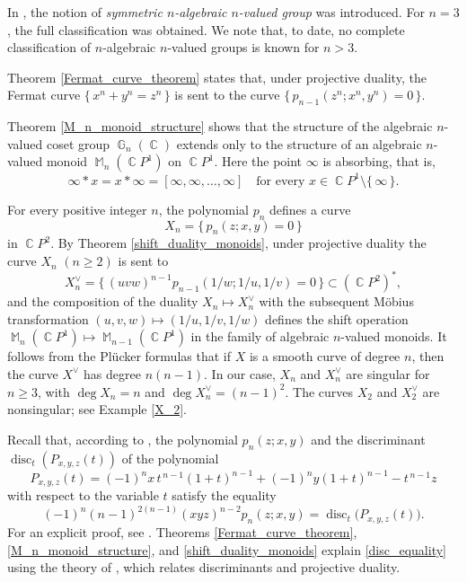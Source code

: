 \documentclass[14pt, dvipsnames]{extarticle}
\theoremstyle{plain}
\theoremstyle{definition}
\theoremstyle{remark}
\DeclareMathOperator{\disc}{\mathrm{disc}}
\DeclareMathOperator{\G}{\mathbb{G}}
\DeclareMathOperator{\Cc}{\mathbb{C}}
\DeclareMathOperator{\M}{\mathbb{M}}
\begin{document}
{In \cite{BK}, the notion of \textit{symmetric $n$-algebraic $n$-valued group} was introduced. For $n = 3$, the full classification was obtained. We note that, to date, no complete classification of $n$-algebraic $n$-valued groups is known for $n>3$.} 

Theorem \ref{Fermat_curve_theorem} states that, under projective duality, the Fermat curve $\{\,x^n+y^n=z^n\,\}$ is sent to the curve $\{\,p_{n-1}(z^n;x^n,y^n)=0\,\}$.

Theorem \ref{M_n_monoid_structure} shows that the structure of the algebraic $n$-valued coset group $\G_n(\Cc)$ extends only to the structure of an algebraic $n$-valued monoid $\M_n(\Cc\!P^1)$ on $\Cc\!P^1$. Here the point $\infty$ is absorbing, that is,
\[
\infty\ast x=x\ast\infty=[\infty,\infty,\dots,\infty]
\quad\text{for every }x\in \Cc\!P^1\setminus\{\,\infty\,\}.
\]

For every positive integer $n$, the polynomial $p_n$ defines a curve
$$X_n=\{\,p_n(z;x,y)=0\,\}$$
in $\Cc\!P^2$. By Theorem \ref{shift_duality_monoids}, under projective duality the curve $X_n$ $(n\ge 2)$ is sent to
\[
X_n^{\vee}=\{\,(uvw)^{n-1}p_{n-1}(1/w;1/u,1/v)=0\,\}\subset (\Cc\!P^2)^{\ast},
\]
and the composition of the duality $X_n\mapsto X_n^{\vee}$ with the subsequent Möbius transformation $(u,v,w)\mapsto (1/u,1/v,1/w)$ defines the shift operation $\M_n(\Cc\!P^1)\mapsto \M_{n-1}(\Cc\!P^1)$ in the family of algebraic $n$-valued monoids. It follows from the Plücker formulas \cite[Proposition 2.4]{Gelfand} that if $X$ is a smooth curve of degree $n$, then the curve $X^{\vee}$ has degree $n(n-1)$. In our case, $X_n$ and $X_n^{\vee}$ are singular for $n \ge 3$, with $\deg X_n = n$ and $\deg X_n^{\vee} = (n -1)^2$. The curves $X_2$ and $X_2^{\vee}$ are nonsingular; see Example \ref{X_2}. 

Recall that, according to \cite[Theorem 2.3]{Gaiur}, the polynomial $p_n(z;x,y)$ and the discriminant $\disc_t(P_{x,y,z}(t))$ of the polynomial
$$P_{x,y,z}(t)=(-1)^n x\,t^{\,n-1}(1+t)^{n-1}+(-1)^n y(1+t)^{n-1}-t^{\,n-1}z$$
with respect to the variable $t$ satisfy the equality
\begin{equation}\label{disc_equality}
(-1)^n (n-1)^{2(n-1)} (xyz)^{n-2} p_n(z;x,y)=\disc_t\bigl(P_{x,y,z}(t)\bigr).
\end{equation}
For an explicit proof, see \cite[Theorem 8]{BK}. Theorems \ref{Fermat_curve_theorem}, \ref{M_n_monoid_structure}, and \ref{shift_duality_monoids} explain \eqref{disc_equality} using the theory of \cite{Gelfand}, which relates discriminants and projective duality.
\end{document}
